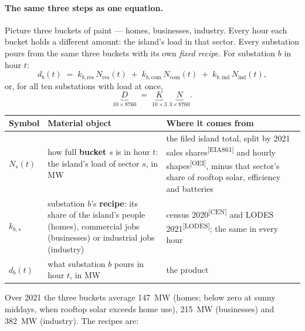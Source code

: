 \documentclass[11pt,a4paper]{article}
\newcommand{\src}[1]{\textsuperscript{[#1]}}
\begin{document}
\paragraph{The same three steps as one equation.} Picture three buckets of paint ---
homes, businesses, industry. Every hour each bucket holds a different amount: the
island's load in that sector. Every substation pours from the same three buckets with
its own \emph{fixed recipe}. For substation $b$ in hour $t$:
\begin{equation}
  d_b(t) \;=\; k_{b,\text{res}}\,N_{\text{res}}(t) \;+\; k_{b,\text{com}}\,N_{\text{com}}(t)
  \;+\; k_{b,\text{ind}}\,N_{\text{ind}}(t),
  \label{eq:demand}
\end{equation}
or, for all ten substations with load at once,
\[
  \underbrace{D}_{10\times 8760} \;=\; \underbrace{K}_{10\times 3}\;
  \underbrace{N}_{3\times 8760}.
\]

\begin{center}
\small
\begin{tabular}{@{}lp{}p{}@{}}
\toprule
\textbf{Symbol} & \textbf{Material object} & \textbf{Where it comes from} \\
\midrule
$N_s(t)$ & how full \textbf{bucket} $s$ is in hour $t$: the island's load of sector $s$,
  in MW & the filed island total, split by 2021 sales shares\src{EIA861} and hourly
  shapes\src{OEI}, minus that sector's share of rooftop solar, efficiency and
  batteries \\
$k_{b,s}$ & substation $b$'s \textbf{recipe}: its share of the island's people (homes),
  commercial jobs (businesses) or industrial jobs (industry) & census 2020\src{CEN} and
  LODES 2021\src{LODES}; the same in every hour \\
$d_b(t)$ & what substation $b$ pours in hour $t$, in MW & the product \\
\bottomrule
\end{tabular}
\end{center}

\noindent Over 2021 the three buckets average \SI{147}{MW} (homes; below zero at sunny
middays, when rooftop solar exceeds home use), \SI{215}{MW} (businesses) and
\SI{382}{MW} (industry). The recipes are:
\end{document}
